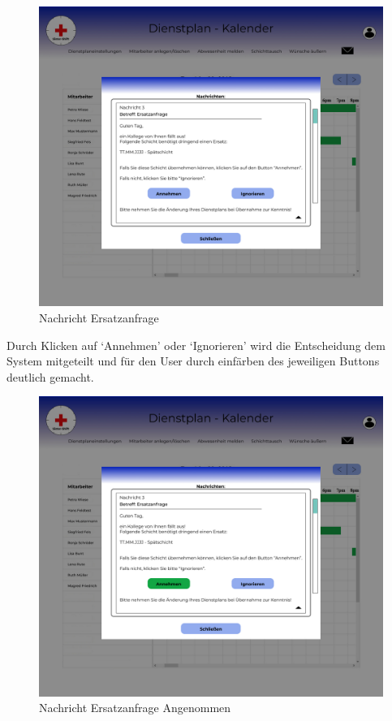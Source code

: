 \documentclass[11pt,
paper=a4,
bibtotocnumbered,	  %
liststotocnumbered,  %
DIV=calc,		  %
tablecaptionabove,	  %
headinclude,
]{article}
\begin{document}
\begin{figure}[H]
\includegraphics[width=1\textwidth]{Bilder/Screens/NachrichtKrankenpflegerErsatzanfrage.jpg}{\centering}
\caption{Nachricht Ersatzanfrage}
\end{figure}
Durch Klicken auf ‘Annehmen’ oder ‘Ignorieren’ wird die Entscheidung dem System mitgeteilt und für den User durch einfärben des jeweiligen Buttons deutlich gemacht.
\begin{figure}[H]
\includegraphics[width=1\textwidth]{Bilder/Screens/NachrichtErsatzanfrageangenommen.jpg}{\centering}
\caption{Nachricht Ersatzanfrage Angenommen}
\end{figure}
\end{document}
